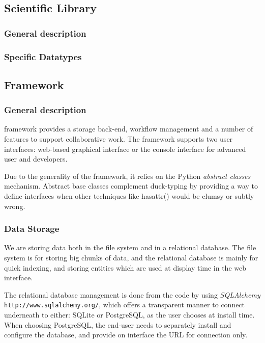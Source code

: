 	\subsection{\TVB Scientific Library}

	\subsubsection{General description}

	\subsubsection{\TVB Specific Datatypes}


	\subsection{\TVB Framework}

	\subsubsection{General description}

\TVB framework provides a storage back-end, workflow management and a number of features to
support collaborative work. The framework supports two user interfaces: web-based graphical interface or the
console interface for advanced user and developers.

Due to the generality of the framework, it relies on the Python \emph{abstract classes} mechanism.
Abstract base classes complement duck-typing by providing a way to define
interfaces when other techniques like hasattr() would be clumsy or subtly wrong.

\subsubsection{Data Storage}

We are storing data both in the file system and in a relational database.
The file system is for storing big chunks of data, and the relational database is mainly for quick indexing, 
and storing entities which are used at display time in the web interface.

The relational database management is done from the code by using \emph{SQLAlchemy} \texttt{http://www.sqlalchemy.org/}, 
which offers a transparent manner to connect underneath to either: SQLite or PostgreSQL, as the user chooses at install time.
When choosing PostgreSQL, the end-user needs to separately install and configure the database, and provide on \TVB
interface the URL for connection only.


